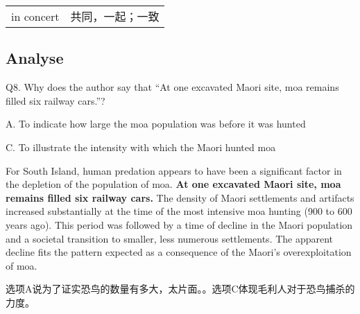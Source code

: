 \begin{tabular}{ll}
    in concert & 共同，一起；一致 \\
\end{tabular}

\subsection{Analyse}

\begin{blk}
    \begin{qst}
        Q8. Why does the author say that “At one excavated Maori site, moa remains filled six railway cars.”?
    \end{qst}

    \begin{chc}
        A. To indicate how large the moa population was before it was hunted

        C. To illustrate the intensity with which the Maori hunted moa
    \end{chc}

    \begin{psgq}
        For South Island, human predation appears to have been a significant factor in the depletion of the population of moa. \textbf{At one excavated Maori site, moa remains filled six railway cars.} The density of Maori settlements and artifacts increased substantially at the time of the most intensive moa hunting (900 to 600 years ago). This period was followed by a time of decline in the Maori population and a societal transition to smaller, less numerous settlements. The apparent decline fits the pattern expected as a consequence of the Maori’s overexploitation of moa.
    \end{psgq}

    \begin{nlz}
        选项A说为了证实恐鸟的数量有多大，太片面。。选项C体现毛利人对于恐鸟捕杀的力度。
    \end{nlz}
\end{blk}
